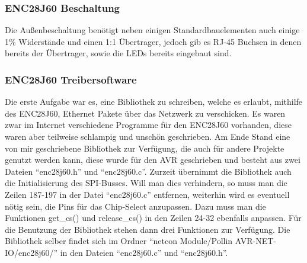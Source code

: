 \documentclass[a4paper,14pt,headsepline]{scrartcl}
\begin{document}
\subsubsection{ENC28J60 Beschaltung}
Die Außenbeschaltung benötigt neben einigen Standardbauelementen auch einige 1\% Widerstände und einen 1:1 Übertrager, jedoch gib es RJ-45 Buchsen in denen bereits der Übertrager, sowie die LEDs bereits eingebaut sind.
\begin{figure}[h]
\begin{center}
\end{center}
\end{figure}

\newpage

\subsubsection{ENC28J60 Treibersoftware}
Die erste Aufgabe war es, eine Bibliothek zu schreiben, welche es erlaubt, mithilfe des ENC28J60, Ethernet Pakete über das Netzwerk zu verschicken. Es waren zwar im Internet verschiedene Programme für den ENC28J60 vorhanden, diese waren aber teilweise schlampig und unschön geschrieben. Am Ende Stand eine von mir geschriebene Bibliothek zur Verfügung, die auch für andere Projekte genutzt werden kann, diese wurde für den AVR geschrieben und besteht aus zwei Dateien "`enc28j60.h"' und "`enc28j60.c"'. Zurzeit übernimmt die Bibliothek auch die Initialisierung des SPI-Busses. Will man dies verhindern, so muss man die Zeilen 187-197 in der Datei "`enc28j60.c"' entfernen, weiterhin wird es eventuell nötig sein, die  Pins für das Chip-Select anzupassen. Dazu muss man die Funktionen get\_cs() und release\_cs() in den Zeilen 24-32 ebenfalls anpassen. Für die Benutzung der Bibliothek stehen dann drei Funktionen zur Verfügung. Die Bibliothek selber findet sich im Ordner "`netcon Module/Pollin AVR-NET-IO/enc28j60/"' in den Dateien "`enc28j60.c"' und "`enc28j60.h"'.
\end{document}
